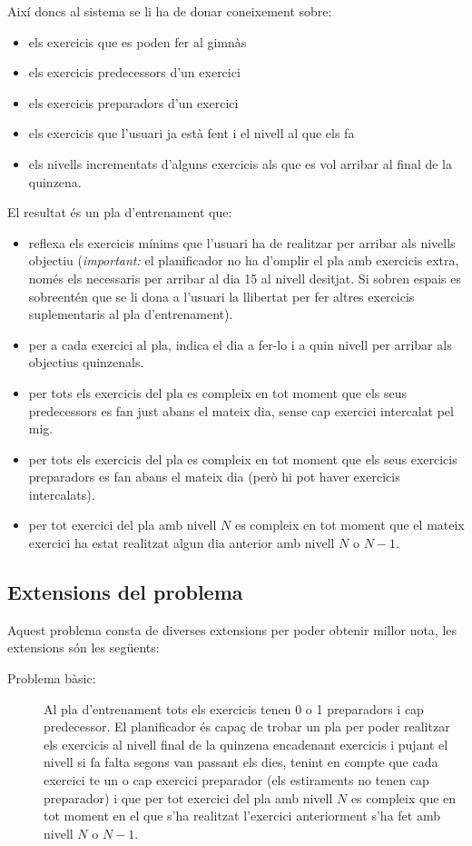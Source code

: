 \documentclass[a4paper,12pt, UTF-8]{article}
\begin{document}
Així doncs al sistema se li ha de donar coneixement sobre:

\begin{itemize}
	\item els exercicis que es poden fer al gimnàs
	\item els exercicis predecessors d'un exercici
	\item els exercicis preparadors d'un exercici
	\item els exercicis que l'usuari ja està fent i el nivell al que els fa
	\item els nivells incrementats d'alguns exercicis als que es vol arribar al final de la quinzena.
\end{itemize}

El resultat és un pla d'entrenament que:
\begin{itemize}
	\item reflexa els exercicis mínims que l'usuari ha de realitzar per arribar als nivells objectiu (\emph{important:} el planificador no ha d'omplir el pla amb exercicis extra, només els necessaris per arribar al dia 15 al nivell desitjat. Si sobren espais es sobreentén que se li dona a l'usuari la llibertat per fer altres exercicis suplementaris al pla d'entrenament).
	\item per a cada exercici al pla, indica el dia a fer-lo i a quin nivell per arribar als objectius quinzenals.
	\item per tots els exercicis del pla es compleix en tot moment que els seus predecessors es fan just abans el mateix dia, sense cap exercici intercalat pel mig. 
	\item per tots els exercicis del pla es compleix en tot moment que els seus exercicis preparadors es fan abans el mateix dia (però hi pot haver exercicis intercalats).
	\item per tot exercici del pla amb nivell $N$ es compleix en tot moment que el mateix exercici ha estat realitzat algun dia anterior amb nivell $N$ o $N - 1$.
\end{itemize}

\subsection{Extensions del problema}

Aquest problema consta de diverses extensions per poder obtenir millor nota, les extensions són les següents:

\begin{description}
	\item[Problema bàsic:] Al pla d'entrenament tots els exercicis tenen 0 o 1 preparadors i cap predecessor. El planificador és capaç de trobar un pla per poder realitzar els exercicis al nivell final de la quinzena encadenant exercicis i pujant el nivell si fa falta segons van passant els dies, tenint en compte que cada exercici te un o cap exercici preparador (els estiraments no tenen cap preparador) i que per tot exercici del pla amb nivell $N$ es compleix que en tot moment en el que s'ha realitzat l'exercici anteriorment s'ha fet amb nivell $N$ o $N - 1$.
	 
\end{description}
\end{document}
